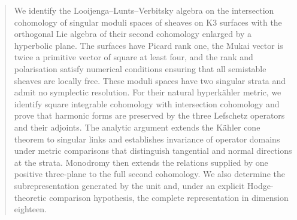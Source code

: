 \begin{abstract}
We identify the Looijenga--Lunts--Verbitsky algebra on the intersection
cohomology of singular moduli spaces of sheaves on K3 surfaces
with the orthogonal Lie algebra of their second cohomology enlarged by
a hyperbolic plane. The surfaces have Picard rank one, the Mukai
vector is twice a primitive vector of square at least four, and
the rank and polarisation satisfy numerical conditions ensuring
that all semistable sheaves are locally free. These moduli spaces
have two singular strata and
admit no symplectic resolution. For their natural hyperk\"ahler
metric, we identify square integrable cohomology with intersection
cohomology and prove that harmonic forms are preserved by the three
Lefschetz operators and their adjoints. The analytic argument extends
the K\"ahler cone theorem to singular links and establishes invariance
of operator domains under metric comparisons that distinguish
tangential and normal directions at the strata. Monodromy then
extends the relations supplied by one positive three-plane to the
full second cohomology. We also determine the subrepresentation
generated by the unit and, under an explicit Hodge-theoretic
comparison hypothesis, the complete representation in dimension
eighteen.
\end{abstract}
